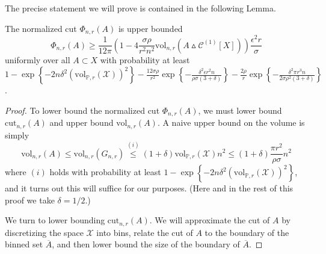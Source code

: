 \documentclass[11pt,twoside]{article}
\newcommand{\set}[1]{\left\{#1\right\}}
\newcommand{\vol}{\mathrm{vol}}
\newcommand{\cut}{\mathrm{cut}}
\newcommand{\1}{\mathbbm{1}}
\newcommand{\Xbf}{X}
\newcommand{\Pbb}{\mathbb{P}}
\newcommand{\Cset}{\mathcal{C}}
\begin{document}
The precise statement we will prove is contained in the following Lemma.
\begin{lemma}
	\label{lem:normalized_cut_lb}
	The normalized cut $\Phi_{n,r}(A)$ is upper bounded
	\begin{equation*}
	\Phi_{n,r}(A) \geq \frac{1}{12\pi} \left(1 - 4\frac{\sigma \rho}{r^2 n^2} \vol_{n,r}(A \vartriangle \Cset^{(1)}[\Xbf]) \right) \frac{\epsilon^2 r}{\sigma}
	\end{equation*}
	uniformly over all $A \subset X$ with probability at least $1 - \exp\set{-2n\delta^2(\vol_{\Pbb,r}(\mathcal{X}))^2} - \frac{12\sigma \rho}{r^2} \exp\set{-\frac{\delta^2\epsilon r^2 n}{\rho \sigma(3 + \delta)}} - \frac{2\rho}{r}\exp\set{-\frac{\delta^2\pi r^3n}{2\sigma\rho^2(3 + \delta)}}$.
\end{lemma}
\begin{proof}
	To lower bound the normalized cut $\Phi_{n,r}(A)$, we must lower bound $\cut_{n,r}(A)$ and upper bound $\vol_{n,r}(A)$. A naive upper bound on the volume is simply 
	\begin{equation}
	\label{eqn:normalized_cut_lb_pf4}
	\vol_{n,r}(A) \leq \vol_{n,r}(G_{n,r}) \overset{(i)}{\leq} (1 + \delta)  \vol_{\Pbb,r}(\mathcal{X}) n^2 \leq (1 + \delta)\frac{\pi r^2}{\rho \sigma} n^2
	\end{equation}
	where $(i)$ holds with probability at least $1 - \exp\set{-2n\delta^2(\vol_{\Pbb,r}(\mathcal{X}))^2}$, and it turns out this will suffice for our purposes. (Here and in the rest of this proof we take $\delta = 1/2$.)
	
	We turn to lower bounding $\cut_{n,r}(A)$. We will approximate the cut of $A$ by discretizing the space $\mathcal{X}$ into bins, relate the cut of $A$ to the boundary of the binned set $\overline{A}$, and then lower bound the size of the boundary of $\overline{A}$.
	

\end{proof}
\end{document}
